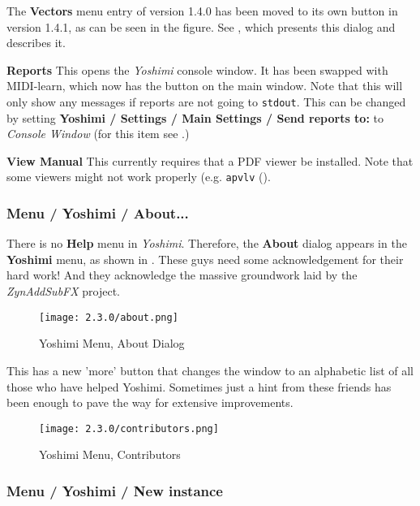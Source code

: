    The \textbf{Vectors} menu entry of version 1.4.0 has been moved to its own
   button in version 1.4.1, as can be seen in the figure.  See
   , which presents this dialog and
   describes it.

   \textbf{Reports} This opens the \textsl{Yoshimi} console window.
   It has been swapped with MIDI-learn, which now has the button on the main window.
   Note that this will only show any messages if reports are not going to
   \texttt{stdout}. This can be changed by setting \textbf{Yoshimi / Settings
   / Main Settings / Send reports to:} to \textsl{Console Window}
   (for this item see
   .)

   \textbf{View Manual} This currently requires that a PDF viewer
   be installed.
   Note that some viewers might not work properly
   (e.g. \texttt{apvlv} (\cite{apvlv}).

\subsubsection{Menu / Yoshimi / About...}
\label{subsubsec:menu_yoshimi_about}

   There is no \textbf{Help} menu in \textsl{Yoshimi}.  Therefore, the
   \textbf{About} dialog appears in the \textbf{Yoshimi} menu, as shown in
   .
   These guys need some acknowledgement for their hard work!
   And they acknowledge the massive groundwork laid by the
   \textsl{ZynAddSubFX} project.

\begin{figure}[H]
   \centering
   \texttt{[image: 2.3.0/about.png]}
   \caption{Yoshimi Menu, About Dialog}
   \label{fig:yoshimi_about_dialog}
\end{figure}
    This has a new 'more' button that changes the window to an alphabetic list of
    all those who have helped Yoshimi. Sometimes just a hint from these friends
    has been enough to pave the way for extensive improvements.
\begin{figure}[H]
   \centering
   \texttt{[image: 2.3.0/contributors.png]}
   \caption{Yoshimi Menu, Contributors}
   \label{fig:yoshimi_contributors}
\end{figure}

\subsubsection{Menu / Yoshimi / New instance}
\label{subsubsec:menu_yoshimi_new_instance}

